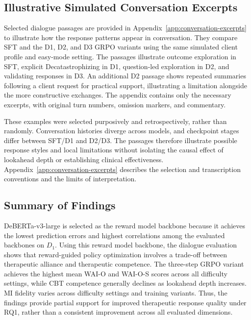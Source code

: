\subsection{Illustrative Simulated Conversation Excerpts}
\label{sec:illustrative-conversations}

Selected dialogue passages are provided in Appendix~\ref{app:conversation-excerpts} to illustrate how the response patterns appear in conversation. They compare SFT and the D1, D2, and D3 GRPO variants using the same simulated client profile and easy-mode setting. The passages illustrate outcome exploration in SFT, explicit Decatastrophizing in D1, question-led exploration in D2, and validating responses in D3. An additional D2 passage shows repeated summaries following a client request for practical support, illustrating a limitation alongside the more constructive exchanges. The appendix contains only the necessary excerpts, with original turn numbers, omission markers, and commentary.

These examples were selected purposively and retrospectively, rather than randomly. Conversation histories diverge across models, and checkpoint stages differ between SFT/D1 and D2/D3. The passages therefore illustrate possible response styles and local limitations without isolating the causal effect of lookahead depth or establishing clinical effectiveness. Appendix~\ref{app:conversation-excerpts} describes the selection and transcription conventions and the limits of interpretation.


\subsection{Summary of Findings}

DeBERTa-v3-large is selected as the reward model backbone because it achieves the lowest prediction errors and highest correlations among the evaluated backbones on \(D_1\). Using this reward model backbone, the dialogue evaluation shows that reward-guided policy optimization involves a trade-off between therapeutic alliance and therapeutic competence. The three-step GRPO variant achieves the highest mean WAI-O and WAI-O-S scores across all difficulty settings, while CBT competence generally declines as lookahead depth increases. MI fidelity varies across difficulty settings and training variants. Thus, the findings provide partial support for improved therapeutic response quality under RQ1, rather than a consistent improvement across all evaluated dimensions.

